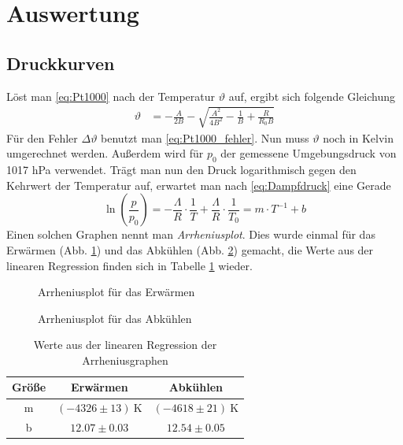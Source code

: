\documentclass[12pt,a4paper,titlepage,headinclude,bibtotoc]{scrartcl}
\begin{document}
\section{Auswertung}
\label{sec:auswertung}
\subsection{Druckkurven}
Löst man \eqref{eq:Pt1000} nach der Temperatur $\vartheta$ auf, ergibt sich folgende Gleichung
\begin{align}
	\vartheta&=-\frac{A}{2B}-\sqrt{\frac{A^2}{4B^2}-\frac{1}{B}+\frac{R}{R_0 B}}
\end{align}
Für den Fehler $\Delta\vartheta$ benutzt man \eqref{eq:Pt1000_fehler}.
Nun muss $\vartheta$ noch in Kelvin umgerechnet werden.
Außerdem wird für $p_0$ der gemessene Umgebungsdruck von 1017 hPa verwendet.
Trägt man nun den Druck logarithmisch gegen den Kehrwert der Temperatur auf, erwartet man nach \eqref{eq:Dampfdruck} eine Gerade $$\ln\left(\frac{p}{p_0}\right) = -\frac{\Lambda}{R}\cdot\frac{1}{T}+\frac{\Lambda}{R}\cdot \frac{1}{T_0} = m \cdot T^{-1} + b$$
Einen solchen Graphen nennt man \textit{Arrheniusplot}.
Dies wurde einmal für das Erwärmen (Abb. \ref{fig:mess1}) und das Abkühlen (Abb. \ref{fig:mess2}) gemacht, die Werte aus der linearen Regression finden sich in Tabelle \ref{tab:regErg} wieder.

\begin{figure}[!htb]
	\centering
	
	\caption{Arrheniusplot für das Erwärmen}
	\label{fig:mess1}
\end{figure}

\begin{figure}[!htb]
	\centering
	
	\caption{Arrheniusplot für das Abkühlen}
	\label{fig:mess2}
\end{figure}

\begin{table}[!htb]
 \centering
 \begin{tabular}{|c|c|c|}
  \hline
  Größe&Erwärmen&Abkühlen\\
  \hline
  m & $(-4326 \pm 13)~\si{\kelvin}$ & $(-4618 \pm 21)~\si{\kelvin}$ \\
  b & $12.07  \pm 0.03$ & $12.54 \pm 0.05$ \\
  \hline
 \end{tabular}
 \caption{Werte aus der linearen Regression der Arrheniusgraphen} 
 \label{tab:regErg}
\end{table}
\end{document}
